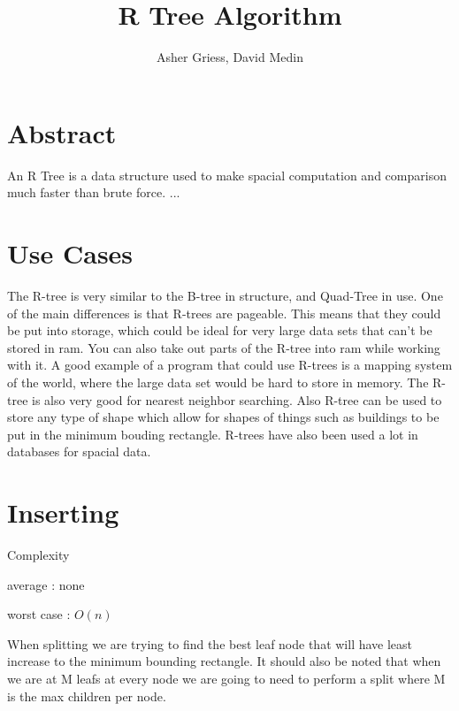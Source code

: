 \documentclass{article}
\author{Asher Griess, David Medin}
\title{R Tree Algorithm}
\begin{document}
\maketitle

\section{Abstract}
An R Tree is a data structure used to make spacial computation and comparison much faster than brute force.  ...

\section{Use Cases}
The R-tree is very similar to the B-tree in structure, and Quad-Tree in use. One of the main differences is that
R-trees are pageable. This means that they could be put into storage, which could be ideal for very large data sets
that can't be stored in ram. You can also take out parts of the R-tree into ram while working with it. A good example
of a program that could use R-trees is a mapping system of the world, where the large data set would be hard to store in memory.
The R-tree is also very good for nearest neighbor searching. Also R-tree can be used to store any type of shape which allow for shapes
of things such as buildings to be put in the minimum bouding rectangle. R-trees have also been used a lot in databases for spacial data.


\section{Inserting}
Complexity

average : none

worst case : $O(n)$

When splitting we are trying to find the best leaf node
that will have least increase to the minimum bounding rectangle.
It should also be noted that when we are at M leafs at every node we are going
to need to perform a split where M is the max children per node.

\end{document}
